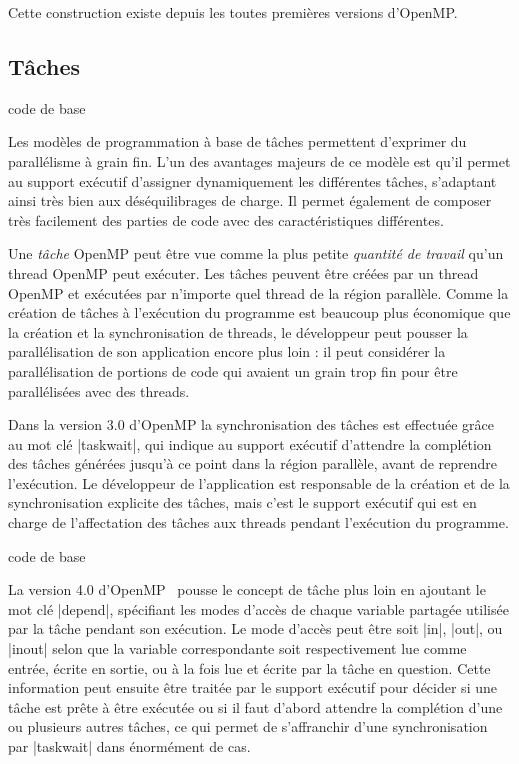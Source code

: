 Cette construction existe depuis les toutes premières versions d'OpenMP.


\subsection{Tâches}

\begin{todo}
  code de base
\end{todo}

Les modèles de programmation à base de tâches permettent d'exprimer du parallélisme à grain fin. L'un des avantages majeurs de ce modèle est qu'il permet au support exécutif d'assigner dynamiquement les différentes tâches, s'adaptant ainsi très bien aux déséquilibrages de charge. Il permet également de composer très facilement des parties de code avec des caractéristiques différentes.

Une \emph{tâche} OpenMP peut être vue comme la plus petite \emph{quantité de travail} qu'un thread OpenMP peut exécuter.
Les tâches peuvent être créées par un thread OpenMP et exécutées par n'importe quel thread de la région parallèle.
Comme la création de tâches à l'exécution du programme est beaucoup plus économique que la création et la synchronisation de threads, le développeur peut pousser la parallélisation de son application encore plus loin : il peut considérer la parallélisation de portions de code qui avaient un grain trop fin pour être parallélisées avec des threads.

Dans la version 3.0 d'OpenMP la synchronisation des tâches est effectuée grâce au mot clé |taskwait|, qui indique au support exécutif d'attendre la complétion des tâches générées jusqu'à ce point dans la région parallèle, avant de reprendre l'exécution.
Le développeur de l'application est responsable de la création et de la synchronisation explicite des tâches, mais c'est le support exécutif qui est en charge de l'affectation des tâches aux threads pendant l'exécution du programme.

\begin{todo}
  code de base
\end{todo}

La version 4.0 d'OpenMP~\cite{openmp40} pousse le concept de tâche plus loin en ajoutant le mot clé |depend|, spécifiant les modes d'accès de chaque variable partagée utilisée par la tâche pendant son exécution.
Le mode d'accès peut être soit |in|, |out|, ou |inout| selon que la variable correspondante soit respectivement lue comme entrée, écrite en sortie, ou à la fois lue et écrite par la tâche en question.
Cette information peut ensuite être traitée par le support exécutif pour décider si une tâche est prête à être exécutée ou si il faut d'abord attendre la complétion d'une ou plusieurs autres tâches, ce qui permet de s'affranchir d'une synchronisation par |taskwait| dans énormément de cas.


